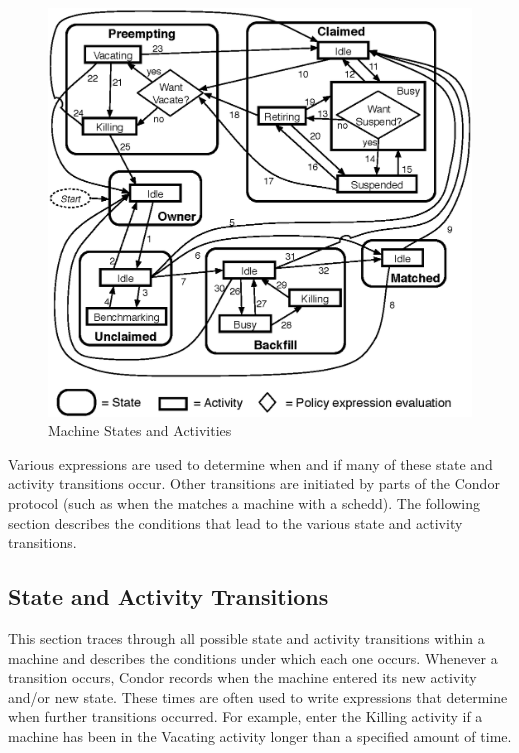 \begin{figure}[hbt]
\centering
\includegraphics{admin-man/machine-activities.eps}
\caption{\label{fig:machine-activities}Machine States and Activities}
\end{figure}

Various expressions are used to determine when and if many of these
state and activity transitions occur.  Other transitions are initiated
by parts of the Condor protocol (such as when the 
matches a machine with a schedd).  The following section describes the
conditions that lead to the various state and activity transitions.

\subsection{\label{sec:State-and-Activity-Transitions}
State and Activity Transitions}

This section traces through all possible state and activity
transitions within a machine and describes the conditions under which
each one occurs.
Whenever a transition occurs, Condor records when the machine entered its
new activity and/or new state.
These times are often used to write expressions that determine
when further transitions occurred.
For example, enter the Killing activity if a machine has been in
the Vacating activity longer than a specified amount of time. 

